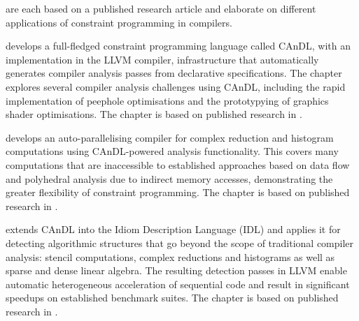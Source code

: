     {\bf{}}
    are each based on a published research article and elaborate on different
    applications of constraint programming in compilers.

    {\bf{}} develops a full-fledged constraint programming
    language called CAnDL, with an implementation in the LLVM compiler,
    infrastructure that automatically generates compiler analysis passes from
    declarative specifications.
    The chapter explores several compiler analysis challenges using CAnDL,
    including the rapid implementation of peephole optimisations and the
    prototypying of graphics shader optimisations.
    The chapter is based on published research in
    \citet{Ginsbach:2018:CDS:3178372.3179515}.

    {\bf{}} develops an auto-parallelising compiler for
    complex reduction and histogram computations using CAnDL-powered analysis
    functionality.
    This covers many computations that are inaccessible to established
    approaches based on data flow and polyhedral analysis due to indirect memory
    accesses, demonstrating the greater flexibility of constraint programming.
    The chapter is based on published research in
    \citet{ginsbach2017discovery}.

    {\bf{}} extends CAnDL into the Idiom Description Language
    (IDL) and applies it for detecting algorithmic structures that go beyond the
    scope of traditional compiler analysis: stencil computations, complex
    reductions and histograms as well as sparse and dense linear algebra.
    The resulting detection passes in LLVM enable automatic heterogeneous
    acceleration of sequential code and result in significant speedups on
    established benchmark suites.
    The chapter is based on published research in
    \citet{Ginsbach:2018:AML:3173162.3173182}.
